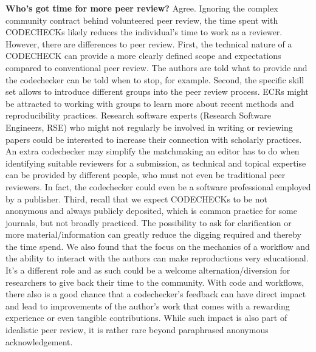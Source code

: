 \documentclass[12pt]{article}
\begin{document}
\textbf{Who's got time for more peer review?} Agree.
Ignoring the complex community contract behind volunteered peer review,
the time spent with CODECHECKs likely reduces the individual's time to work
as a reviewer.
However, there are differences to peer review.
First, the technical nature of a CODECHECK can provide a more 
clearly defined scope and expectations compared to conventional 
peer review. The authors are told what to provide and the codechecker
can be told when to stop, for example.
Second, the specific skill set allows to introduce different groups
into the peer review process. ECRs might be attracted to working with
groups to learn more about recent methods and reproducibility practices.
Research software experts (Research Software Engineers, RSE) who might
not regularly be involved in writing or reviewing papers could be 
interested to increase their connection with scholarly practices.
An extra codechecker may simplify the matchmaking an editor has to do
when identifying suitable reviewers for a submission, as technical and
topical expertise can be provided by different people, who must not even
be traditional peer reviewers. In fact, the codechecker could even be
a software professional employed by a publisher.
Third, recall that we expect CODECHECKs to be not anonymous and always
publicly deposited, which is common practice for some journals, but not
broadly practiced. The possibility to ask for clarification or more 
material/information can greatly reduce the digging required and thereby
the time spend.
We also found that the focus on the mechanics of a
workflow and the ability to interact with the authors can make
reproductions very educational. It's a different role and as such could
be a welcome alternation/diversion for researchers to give back their 
time to the community.
With code and workflows, there also is a good chance that a codechecker's
feedback can have direct impact and lead to improvements of the author's 
work that comes with a rewarding experience or even tangible contributions.
While such impact is also part of idealistic peer review, it is
rather rare beyond paraphrased anonymous acknowledgement.
\end{document}
